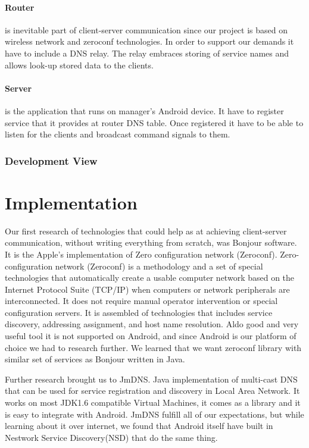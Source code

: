 \paragraph{Router}
is inevitable part of client-server communication since our project is based on wireless network and zeroconf technologies. In order to support our demands it have to include a DNS relay. The relay embraces storing of service names and allows look-up stored data to the clients.

\paragraph{Server}
is the application that runs on manager's Android device. It have to register service that it provides at router DNS table. Once registered it have to be able to listen for the clients and broadcast command signals to them.

\subsubsection{Development View}


\section{Implementation}

Our first research of technologies that could help as at achieving client-server communication, without writing everything from scratch, was Bonjour software. 
It is the Apple's implementation of Zero configuration network (Zeroconf). 
Zero-configuration network (Zeroconf)  is a methodology and a set of special technologies that automatically create a usable computer network based on the Internet Protocol Suite (TCP/IP) when computers or network peripherals are interconnected. 
It does not require manual operator intervention or special configuration servers.
It is assembled of technologies that includes service discovery, addressing assignment, and host name resolution.
Aldo good and very useful tool it is not supported on Android, and since Android is our platform of choice we had to research further. 
We learned that we want zeroconf library with similar set of services as Bonjour written in Java.


Further research brought us to JmDNS. Java implementation of multi-cast DNS that can be used for service registration and discovery in Local Area Network. 
It works on most JDK1.6 compatible Virtual Machines, it comes as a library and it is easy to integrate with Android. 
JmDNS fulfill all of our expectations, but while learning about it over internet, we found that Android itself have built in Nestwork Service Discovery(NSD) that do the same thing.


